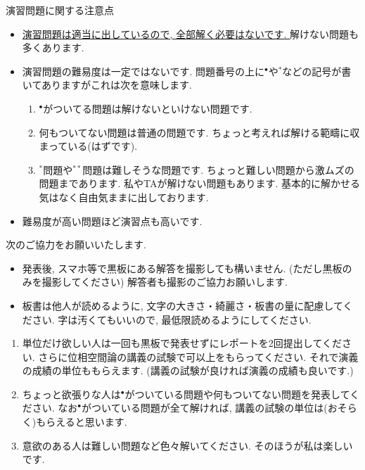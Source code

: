 \documentclass[dvipdfmx,a4paper,11pt]{article}
\theoremstyle{definition}
\begin{document}
演習問題に関する注意点
\begin{itemize}
  \setlength{\parskip}{0cm} 
  \setlength{\itemsep}{0cm} 
\item \underline{演習問題は適当に出しているので, 全部解く必要はないです. } 解けない問題も多くあります.
\item 演習問題の難易度は一定ではないです. 問題番号の上に$^\bullet$や$^*$などの記号が書いてありますがこれは次を意味します.
\begin{enumerate}
  \setlength{\parskip}{0cm} 
  \setlength{\itemsep}{0cm} 
\item $^\bullet$がついてる問題は解けないといけない問題です. %
\item 何もついてない問題は普通の問題です. ちょっと考えれば解ける範疇に収まっている(はずです).
\item $^*$問題や$^{**}$問題は難しそうな問題です. ちょっと難しい問題から激ムズの問題まであります. 私やTAが解けない問題もあります. 基本的に解かせる気はなく自由気ままに出しております.
\end{enumerate}
\item 難易度が高い問題ほど演習点も高いです.
\end{itemize}

次のご協力をお願いいたします.
\begin{itemize}
  \setlength{\parskip}{0cm} 
  \setlength{\itemsep}{0cm} 
\item 発表後, スマホ等で黒板にある解答を撮影しても構いません. (ただし黒板のみを撮影してください) %
解答者も撮影のご協力お願いします.
\item 板書は他人が読めるように, 文字の大きさ・綺麗さ・板書の量に配慮してください. 字は汚くてもいいので, 最低限読めるようにしてください. %
\end{itemize}


\medskip
{}
\begin{enumerate}
  \setlength{\parskip}{0cm} 
  \setlength{\itemsep}{0cm} 
\item 単位だけ欲しい人は一回も黒板で発表せずにレポートを2回提出してください. さらに位相空間論の講義の試験で可以上をもらってください. それで演義の成績の単位ももらえます. (講義の試験が良ければ演義の成績も良いです.)
\item ちょっと欲張りな人は$^\bullet$がついている問題や何もついてない問題を発表してください. なお$^{\bullet}$がついている問題が全て解ければ, 講義の試験の単位は(おそらく)もらえると思います.
\item 意欲のある人は難しい問題など色々解いてください. そのほうが私は楽しいです.
\end{enumerate}
\end{document}
